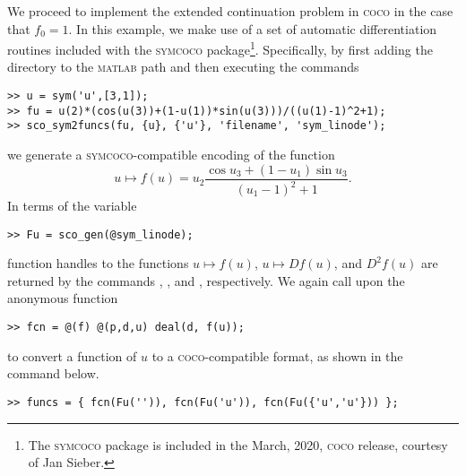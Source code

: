 We proceed to implement the extended continuation problem in \textsc{coco} in the case that $f_0=1$. In this example, we make use of a set of automatic differentiation routines included with the \textsc{symcoco} package\footnote{The \textsc{symcoco} package is included in the March, 2020, \textsc{coco} release, courtesy of Jan Sieber.}. Specifically, by first adding the  directory to the \textsc{matlab} path and then executing the commands
\begin{lstlisting}[language=coco-highlight]
>> u = sym('u',[3,1]);
>> fu = u(2)*(cos(u(3))+(1-u(1))*sin(u(3)))/((u(1)-1)^2+1);
>> sco_sym2funcs(fu, {u}, {'u'}, 'filename', 'sym_linode');
\end{lstlisting}
we generate a \textsc{symcoco}-compatible encoding of the function
\begin{equation}
u\mapsto f(u)=u_2\frac{\cos u_3+(1-u_1)\sin u_3}{(u_1-1)^2+1}.
\end{equation}
In terms of the variable
\begin{lstlisting}[language=coco-highlight]
>> Fu = sco_gen(@sym_linode);
\end{lstlisting}
function handles to the functions $u\mapsto f(u)$, $u\mapsto Df(u)$, and $D^2f(u)$ are returned by the commands , , and , respectively. We again call upon the anonymous function
\begin{lstlisting}[language=coco-highlight]
>> fcn = @(f) @(p,d,u) deal(d, f(u));
\end{lstlisting}
to convert a function of $u$ to a \textsc{coco}-compatible format, as shown in the command below.
\begin{lstlisting}[language=coco-highlight]
>> funcs = { fcn(Fu('')), fcn(Fu('u')), fcn(Fu({'u','u'})) };
\end{lstlisting}

